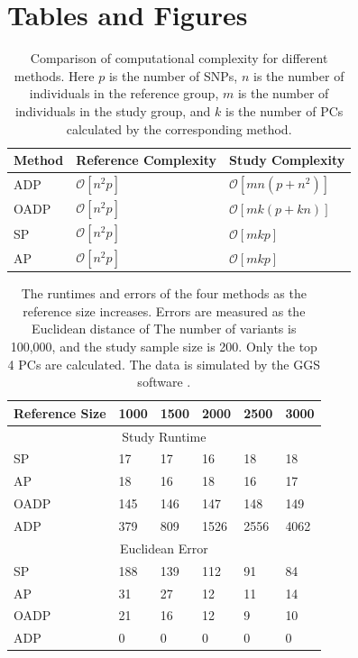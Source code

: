 \documentclass{article}
\newcommand{\bO}{\mathcal{O}}
\begin{document}
\newpage
\section{Tables and Figures}

\begin{table}[h]
  \centering
  \begin{tabular}{|l|l|l|}
    \hline
    Method & Reference Complexity & Study Complexity \\ 
    \hline
    ADP & $\bO[n^2 p]$ & $\bO[mn(p + n^2)]$ \\
    \hline
    OADP & $\bO[n^2 p]$ & $\bO[mk(p + k n)]$ \\
    \hline
    SP & $\bO[n^2p]$ & $\bO[mkp]$ \\
    \hline
    AP & $\bO[n^2p]$ &  $\bO[mkp]$ \\
    \hline
  \end{tabular}
  \caption{
    Comparison of computational complexity for different methods.
    Here $p$ is the number of SNPs,
    $n$ is the number of individuals in the reference group,
    $m$ is the number of individuals in the  study group,
    and $k$ is the number of PCs calculated by the corresponding method.
  }
  \label{tbl:cplx}
\end{table}


\begin{table}[h]
  \centering
  \begin{tabular}{|l|l|l|l|l|l|}
    \hline
    Reference Size & 1000 & 1500 & 2000 & 2500 & 3000 \\
    \hline
    \multicolumn{6}{|c|}{Study Runtime} \\
    \hline
    SP         &  17  & 17   & 16   & 18   & 18   \\
    AP         &  18  & 16   & 18  & 16   & 17  \\
    OADP       &  145  & 146   & 147   & 148   & 149   \\
    ADP        &  379  & 809 & 1526 & 2556 & 4062 \\
    \hline
    \multicolumn{6}{|c|}{Euclidean Error} \\
    \hline
    SP         &  188  & 139   & 112   & 91   & 84   \\
    AP         &  31  & 27   & 12  & 11   & 14  \\
    OADP       &  21  & 16   & 12   & 9   & 10   \\
    ADP        &  0  & 0 & 0 & 0 & 0 \\
    \hline
  \end{tabular}
  \caption{
    The runtimes and errors of the four methods
    as the reference size increases.
    Errors are measured as the Euclidean distance of
    The number of variants is 100,000,
    and the study sample size is 200.
    Only the top 4 PCs are calculated.
    The data is simulated by the GGS software \citep{mathieson2012differential}.
    }
\end{table}
\end{document}
